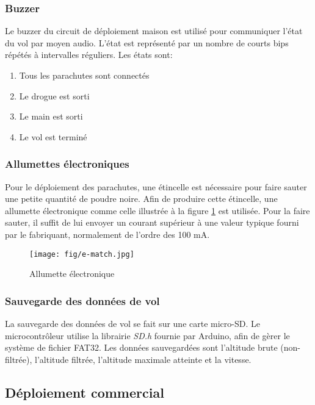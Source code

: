\subsubsection{Buzzer}

Le buzzer du circuit de déploiement maison est utilisé pour communiquer l'état
du vol par moyen audio. L'état est représenté par un nombre de courts bips
répétés à intervalles réguliers. Les états sont:

\begin{enumerate}
	\item Tous les parachutes sont connectés
	\item Le drogue est sorti
	\item Le main est sorti
	\item Le vol est terminé
\end{enumerate}


\subsubsection{Allumettes électroniques}

Pour le déploiement des parachutes, une étincelle est nécessaire pour faire
sauter une petite quantité de poudre noire. Afin de produire cette étincelle,
une allumette électronique comme celle illustrée à la figure \ref{f:e-match} est
utilisée. Pour la faire sauter, il suffit de lui envoyer un courant supérieur
à une valeur typique fourni par le fabriquant, normalement de l'ordre des
100 mA.

\begin{figure}[H]
	\center
	\texttt{[image: fig/e-match.jpg]}
	\caption{Allumette électronique}
	\label{f:e-match}
\end{figure}

\subsubsection{Sauvegarde des données de vol}

La sauvegarde des données de vol se fait sur une carte micro-SD. Le
microcontrôleur utilise la librairie \textit{SD.h} fournie par Arduino, afin
de gèrer le système de fichier FAT32. Les données sauvegardées sont l'altitude
brute (non-filtrée), l'altitude filtrée, l'altitude maximale atteinte et la
vitesse.

\subsection{Déploiement commercial}

